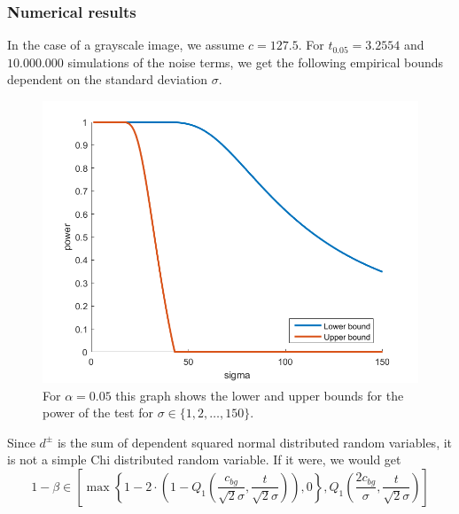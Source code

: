 \documentclass{beamer}
\begin{document}
\subsubsection{Numerical results}

\begin{frame}
	In the case of a grayscale image, we assume $c = 127.5$. For $t_{0.05} = 3.2554$ and $10.000.000$ simulations of the noise terms, we get the following empirical bounds dependent on the standard deviation $\sigma$.
	
	\begin{figure}[h]
		\includegraphics[width=0.6\linewidth]{Testing/SimulatedPower}
		\caption[Simulated power bounds]{For $\alpha = 0.05$ this graph shows the lower and upper bounds for the power of the test for $\sigma \in \{ 1, 2, \dots, 150 \}$.}
		\label{fig:SimulatedPowerBounds}
	\end{figure}
\end{frame}

\begin{frame}
	Since $d^\pm$ is the sum of dependent squared normal distributed random variables, it is not a simple Chi distributed random variable. If it were, we would get
	\begin{equation*}
		1 - \beta \in \left[ \max \left\{ 1 - 2 \cdot \left( 1 - Q_1 \left( \frac{c_{bg}}{\sqrt{2} \sigma}, \frac{t}{\sqrt{2} \sigma} \right) \right), 0 \right\}, Q_1 \left( \frac{2 c_{bg}}{\sigma}, \frac{t}{\sqrt{2} \sigma} \right) \right]
	\end{equation*}
\end{frame}
\end{document}
